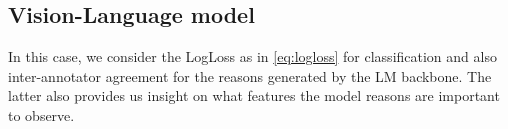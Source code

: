 \documentclass[10pt,twocolumn,letterpaper]{article}
\begin{document}
\subsection{Vision-Language model}
In this case, we consider the LogLoss as in \ref{eq:logloss} for classification and also inter-annotator agreement for the reasons generated by the LM backbone. The latter also provides us insight on what features the model reasons are important to observe. 
{\small


}
\end{document}
